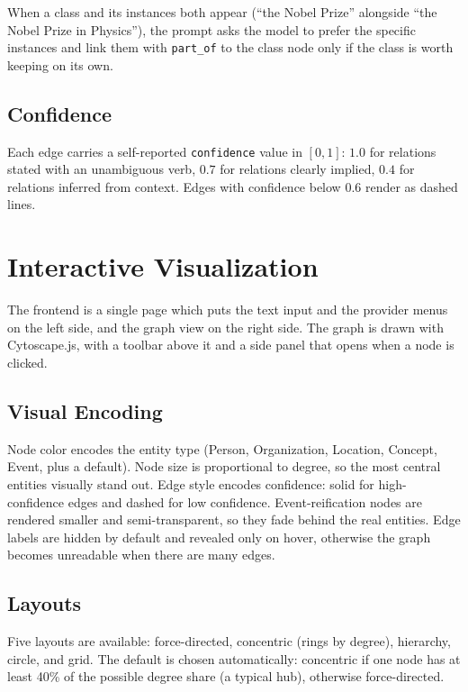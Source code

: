 \documentclass[11pt,a4paper]{article}
\begin{document}
When a class and its instances both appear (``the Nobel Prize'' alongside ``the Nobel Prize in Physics''), the prompt asks the model to prefer the specific instances and link them with \texttt{part\_of} to the class node only if the class is worth keeping on its own.

\subsection{Confidence}\label{sec:confidence}

Each edge carries a self-reported \texttt{confidence} value in $[0,1]$: $1.0$ for relations stated with an unambiguous verb, $0.7$ for relations clearly implied, $0.4$ for relations inferred from context. Edges with confidence below $0.6$ render as dashed lines.

\section{Interactive Visualization}\label{sec:viz}

The frontend is a single page which puts the text input and the provider menus on the left side, and the graph view on the right side. The graph is drawn with Cytoscape.js, with a toolbar above it and a side panel that opens when a node is clicked.

\subsection{Visual Encoding}

Node color encodes the entity type (Person, Organization, Location, Concept, Event, plus a default). Node size is proportional to degree, so the most central entities visually stand out. Edge style encodes confidence: solid for high-confidence edges and dashed for low confidence. Event-reification nodes are rendered smaller and semi-transparent, so they fade behind the real entities. Edge labels are hidden by default and revealed only on hover, otherwise the graph becomes unreadable when there are many edges.

\subsection{Layouts}

Five layouts are available: force-directed, concentric (rings by degree), hierarchy, circle, and grid. The default is chosen automatically: concentric if one node has at least 40\% of the possible degree share (a typical hub), otherwise force-directed.
\end{document}
